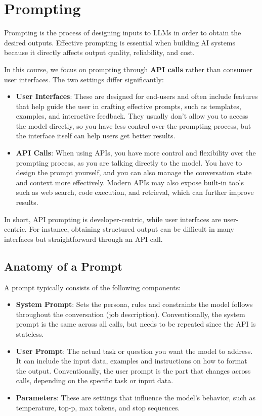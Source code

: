 \section{Prompting}
Prompting is the process of designing inputs to LLMs in order to obtain the desired outputs.
Effective prompting is essential when building AI systems because it directly affects output quality, reliability, and cost.

In this course, we focus on prompting through \textbf{API calls} rather than consumer user interfaces.
The two settings differ significantly: 
\begin{itemize}
    \item \textbf{User Interfaces}: These are designed for end-users and often include features that help guide the user in crafting effective prompts, such as templates, examples, and interactive feedback.
    They usually don't allow you to access the model directly, so you have less control over the prompting process, but the interface itself can help users get better results.
    \item \textbf{API Calls}: When using APIs, you have more control and flexibility over the prompting process, 
    as you are talking directly to the model. You have to design the prompt yourself, and you can also manage the conversation state and context more effectively.
    Modern APIs may also expose built-in tools such as web search, code execution, and retrieval, which can further improve results.
\end{itemize}
In short, API prompting is developer-centric, while user interfaces are user-centric.
For instance, obtaining structured output can be difficult in many interfaces but straightforward through an API call.

\subsection{Anatomy of a Prompt}
A prompt typically consists of the following components:
\begin{itemize}
    \item \textbf{System Prompt}: Sets the persona, rules and constraints the model follows throughout the conversation (job description).
    Conventionally, the system prompt is the same across all calls, but needs to be repeated since the API is stateless.
    \item \textbf{User Prompt}: The actual task or question you want the model to address. 
    It can include the input data, examples and instructions on how to format the output.
    Conventionally, the user prompt is the part that changes across calls, depending on the specific task or input data.
    \item \textbf{Parameters}: These are settings that influence the model's behavior, such as temperature, top-p, max tokens, and stop sequences.
\end{itemize}

